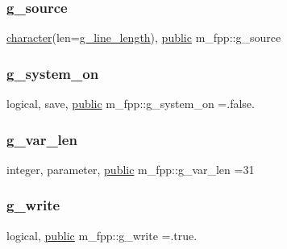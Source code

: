 \mbox{\label{namespacem__fpp_a6e0e464a1765a84236cdda423119523b}} 
\subsubsection{\texorpdfstring{g\+\_\+source}{g\_source}}
{\footnotesize\ttfamily \hyperlink{option__stopwatch_83_8txt_abd4b21fbbd175834027b5224bfe97e66}{character}(len=\hyperlink{namespacem__fpp_ab93f8756cf248cf8db932573009d4664}{g\+\_\+line\+\_\+length}), \hyperlink{M__stopwatch_83_8txt_a2f74811300c361e53b430611a7d1769f}{public} m\+\_\+fpp\+::g\+\_\+source}

\mbox{\label{namespacem__fpp_a7d10506aa84b640d172b33b3263bfa32}} 
\subsubsection{\texorpdfstring{g\+\_\+system\+\_\+on}{g\_system\_on}}
{\footnotesize\ttfamily logical, save, \hyperlink{M__stopwatch_83_8txt_a2f74811300c361e53b430611a7d1769f}{public} m\+\_\+fpp\+::g\+\_\+system\+\_\+on =.false.}

\mbox{\label{namespacem__fpp_a99c57ea4a304975a7afafcf0b292db06}} 
\subsubsection{\texorpdfstring{g\+\_\+var\+\_\+len}{g\_var\_len}}
{\footnotesize\ttfamily integer, parameter, \hyperlink{M__stopwatch_83_8txt_a2f74811300c361e53b430611a7d1769f}{public} m\+\_\+fpp\+::g\+\_\+var\+\_\+len =31}

\mbox{\label{namespacem__fpp_aeb0509a3fc389c28a37387d66ead31e3}} 
\subsubsection{\texorpdfstring{g\+\_\+write}{g\_write}}
{\footnotesize\ttfamily logical, \hyperlink{M__stopwatch_83_8txt_a2f74811300c361e53b430611a7d1769f}{public} m\+\_\+fpp\+::g\+\_\+write =.true.}

